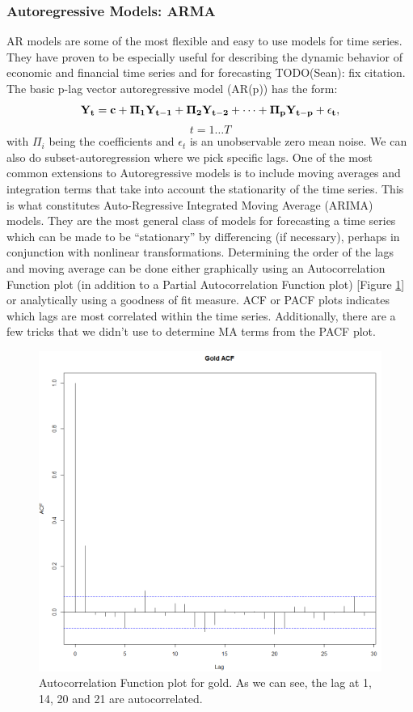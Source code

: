 \subsubsection{Autoregressive Models: ARMA}
AR models are some of the most flexible and easy to use models for time series. They have proven to be especially useful for describing the dynamic behavior of economic and financial time series and for forecasting \cite{tsay, VAR} TODO(Sean): fix citation. \\
The basic p-lag vector autoregressive model (AR(p)) has the form: $$\bf{Y}_t=\bf{c}+\bf{\Pi}_1\bf{Y}_{t-1}+\bf{\Pi}_2\bf{Y}_{t-2}+\cdots+\bf{\Pi}_p\bf{Y}_{t-p}+\epsilon_t,$$ $$t=1\ldots T$$ with $\Pi_i$ being the coefficients and $\epsilon_t$ is an unobservable zero mean noise. We can also do subset-autoregression where we pick specific lags.
One of the most common extensions to Autoregressive models is to include moving averages and integration terms that take into account the stationarity of the time series. This is what constitutes Auto-Regressive Integrated Moving Average (ARIMA) models. They are  the most general class of models for forecasting a time series which can be made to be “stationary” by differencing (if necessary), perhaps in conjunction with nonlinear transformations. 
Determining the order of the lags and moving average can be done either graphically using an Autocorrelation Function plot (in addition to a Partial Autocorrelation Function plot) [Figure \ref{fig:ACF}] or analytically using a goodness of fit measure. ACF or PACF plots indicates which lags are most correlated within the time series. Additionally, there are a few tricks that we didn't use to determine MA terms from the PACF plot.
\begin{figure}[ht]
	\vskip 0.2in
	\begin{center}
		\centerline{\includegraphics[width=\columnwidth]{ACF.png}}
		\caption{Autocorrelation Function plot for gold. As we can see, the lag at 1, 14, 20 and 21 are autocorrelated.}
	\end{center}
	\vskip -0.2in
	\label{fig:ACF}
\end{figure}
